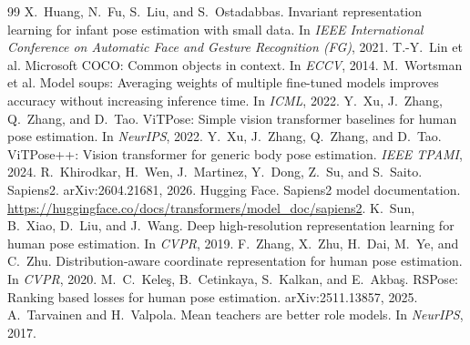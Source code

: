 \documentclass[11pt]{article}
\begin{document}
\begin{thebibliography}{99}\small
{} X.~Huang, N.~Fu, S.~Liu, and S.~Ostadabbas. Invariant representation learning for infant pose estimation with small data. In \emph{IEEE International Conference on Automatic Face and Gesture Recognition (FG)}, 2021.
 T.-Y.~Lin et al. Microsoft COCO: Common objects in context. In \emph{ECCV}, 2014.
 M.~Wortsman et al. Model soups: Averaging weights of multiple fine-tuned models improves accuracy without increasing inference time. In \emph{ICML}, 2022.
 Y.~Xu, J.~Zhang, Q.~Zhang, and D.~Tao. ViTPose: Simple vision transformer baselines for human pose estimation. In \emph{NeurIPS}, 2022.
 Y.~Xu, J.~Zhang, Q.~Zhang, and D.~Tao. ViTPose++: Vision transformer for generic body pose estimation. \emph{IEEE TPAMI}, 2024.
 R.~Khirodkar, H.~Wen, J.~Martinez, Y.~Dong, Z.~Su, and S.~Saito. Sapiens2. arXiv:2604.21681, 2026.
 Hugging Face. Sapiens2 model documentation. \url{https://huggingface.co/docs/transformers/model_doc/sapiens2}.
 K.~Sun, B.~Xiao, D.~Liu, and J.~Wang. Deep high-resolution representation learning for human pose estimation. In \emph{CVPR}, 2019.
 F.~Zhang, X.~Zhu, H.~Dai, M.~Ye, and C.~Zhu. Distribution-aware coordinate representation for human pose estimation. In \emph{CVPR}, 2020.
 M.~C.~Kele\c{s}, B.~Cetinkaya, S.~Kalkan, and E.~Akba\c{s}. RSPose: Ranking based losses for human pose estimation. arXiv:2511.13857, 2025.
 A.~Tarvainen and H.~Valpola. Mean teachers are better role models. In \emph{NeurIPS}, 2017.
\end{thebibliography}
\end{document}
